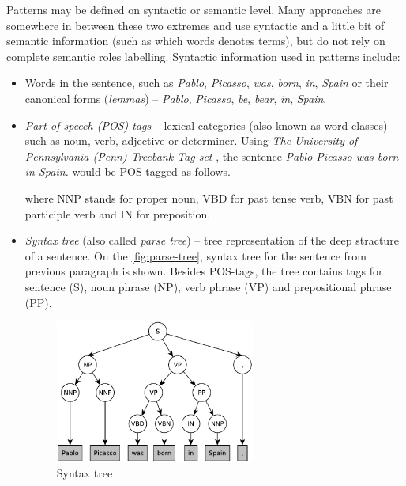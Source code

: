 \documentclass[a4paper, 12pt, twoside]{fithesis2}		%
\renewcommand{\_}{\leavevmode \kern0.07em\vbox{\hrule width0.4em}}
\newcommand{\squarebullet}{\textcolor{black}{\raisebox{0.15em}{\rule{4pt}{4pt}}}}
\newcommand{\emptysquarebullet}{\textcolor{black}{\raisebox{0.10em}{\tiny$\square$}}}
\newenvironment{myItemize}{
  \begin{itemize}[leftmargin=2em,rightmargin=1em,itemsep=\parskip ,parsep=0em,topsep=0em,partopsep=0em]
  \renewcommand{\labelitemi}{\squarebullet}
  \renewcommand{\labelitemii}{\textbullet}
}{
  \end{itemize}
}
\begin{document}
Patterns may be defined on syntactic or semantic level.
Many approaches are somewhere in between these two extremes and use syntactic and a little bit of semantic information (such as which words denotes terms), but do not rely on complete semantic roles labelling. Syntactic information used in patterns include:
\begin{myItemize}
  \item Words in the sentence, such as \emph{Pablo}, \emph{Picasso}, \emph{was}, \emph{born}, \emph{in}, \emph{Spain}
    or their canonical forms (\textit{lemmas}) -- \emph{Pablo}, \emph{Picasso}, \emph{be}, \emph{bear}, \emph{in}, \emph{Spain}.

  \item \textit{Part-of-speech (POS) tags} -- lexical categories (also known as word classes) such as noun, verb, adjective or determiner.
    Using \textit{The University of Pennsylvania (Penn) Treebank Tag-set} \cite{penn-tagset},
    the sentence \emph{Pablo Picasso was born in Spain.} would be POS-tagged as follows.
\begin{code}
\end{code}
    where NNP stands for proper noun, VBD for past tense verb, VBN for past participle verb and IN for preposition.

  \item \textit{Syntax tree} (also called \emph{parse tree}) -- tree representation of the deep stracture of a sentence.
    On the \autoref{fig:parse-tree}, syntax tree for the sentence from previous paragraph is shown.
    Besides POS-tags, the tree contains tags for sentence (S), noun phrase (NP), verb phrase (VP) and prepositional phrase (PP).
  \begin{figure}[h]
    \centering
    \includegraphics[width=0.62\textwidth]{images/parse-tree.pdf}
    \caption{Syntax tree}
    \label{fig:parse-tree}
  \end{figure}
\end{myItemize}
\end{document}
